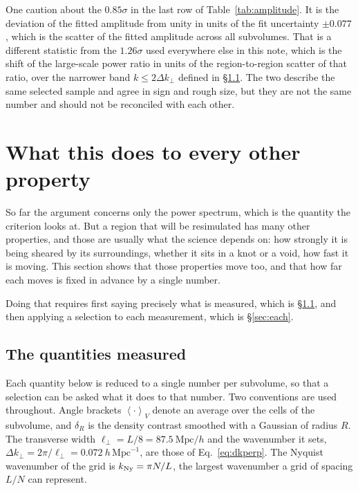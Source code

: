 \documentclass[12pt]{article}
\newcommand{\avg}[1]{\left\langle #1 \right\rangle}
\newcommand{\Mpch}{\ \mathrm{Mpc}/h}
\begin{document}
One caution about the $0.85\sigma$ in the last row of
Table~\ref{tab:amplitude}. It is the deviation of the fitted amplitude from
unity in units of the fit uncertainty $\pm 0.077$, which is the scatter of the
fitted amplitude across all subvolumes. That is a different statistic from the
$1.26\sigma$ used everywhere else in this note, which is the shift of the
large-scale power ratio in units of the region-to-region scatter of that ratio,
over the narrower band $k \le 2\Delta k_\perp$ defined in
\S\ref{sec:quantities}. The two describe the same selected sample and agree in
sign and rough size, but they are not the same number and should not be
reconciled with each other.

\section{What this does to every other property}
\label{sec:conditioning}

So far the argument concerns only the power spectrum, which is the quantity the
criterion looks at. But a region that will be resimulated has many other
properties, and those are usually what the science depends on: how strongly it
is being sheared by its surroundings, whether it sits in a knot or a void, how
fast it is moving. This section shows that those properties move too, and that
how far each moves is fixed in advance by a single number.

Doing that requires first saying precisely what is measured, which is
\S\ref{sec:quantities}, and then applying a selection to each measurement, which
is \S\ref{sec:each}.

\subsection{The quantities measured}
\label{sec:quantities}

Each quantity below is reduced to a single number per subvolume, so that a
selection can be asked what it does to that number. Two conventions are used
throughout. Angle brackets $\avg{\cdot}_V$ denote an average over the cells of
the subvolume, and $\delta_R$ is the density contrast smoothed with a Gaussian of
radius $R$. The transverse width $\ell_\perp = L/8 = 87.5\Mpch$ and the
wavenumber it sets, $\Delta k_\perp = 2\pi/\ell_\perp =
0.072\ h\,\mathrm{Mpc}^{-1}$, are those of Eq.~\eqref{eq:dkperp}. The Nyquist
wavenumber of the grid is $k_{\rm Ny} = \pi N / L$, the largest wavenumber a
grid of spacing $L/N$ can represent.
\end{document}

